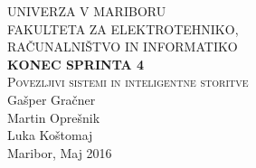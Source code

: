 \documentclass[a4paper,11pt]{article}
\begin{document}
\begin{titlepage}


\newcommand{\HRule}{\rule{\linewidth}{0.5mm}} %

\center %
 

\textsc{ UNIVERZA V MARIBORU\\ FAKULTETA ZA ELEKTROTEHNIKO,\\RAČUNALNIŠTVO IN INFORMATIKO}\\[5cm] %

{ \huge \bfseries \textbf{KONEC SPRINTA 4}}\\[0.4cm] %
\textsc{\large Povezljivi sistemi in inteligentne storitve}\\[5cm] %

{\large Gašper Gračner}\\[0.4cm]
{\large Martin Oprešnik}\\[0.4cm]
{\large Luka Koštomaj}\\[0.4cm] 

\vfill %
{\large Maribor, Maj 2016}\\[3cm] %
\end{titlepage}
\newpage

\end{document}
